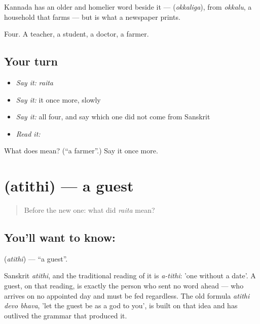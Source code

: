 Kannada has an older and homelier word beside it —  (\emph{okkaliga}), from \emph{okkalu}, a household that farms — but  is what a newspaper prints.

\begin{grammarlens}[title={What you've built}]
Four. A teacher, a student, a doctor, a farmer.
\end{grammarlens}

\subsection*{Your turn}
\begin{itemize}
\raggedright
  \item \emph{Say it:} \emph{raita}
  \item \emph{Say it:} it once more, slowly
  \item \emph{Say it:} all four, and say which one did not come from Sanskrit
  \item \emph{Read it:} \textbf{}
\end{itemize}

\begin{tcolorbox}[breakable,colback=teal!4,colframe=teal!35!black,title={Before you move on}]
What does  mean? (\textquotedblleft{}a farmer\textquotedblright{}.) Say it once more.
\end{tcolorbox}
\section[\texorpdfstring{\kn{ಅತಿಥಿ} (atithi)}{ಅತಿಥಿ (atithi)}]{ (atithi) — a guest}

\label{lesson:KA-C48-guest}



\begin{quote}
Before the new one: what did \emph{raita} mean?
\end{quote}

\subsection*{You'll want to know: }
\textbf{} (\emph{atithi}) — \textquotedblleft{}a guest\textquotedblright{}.

Sanskrit \emph{atithi}, and the traditional reading of it is \emph{a-tithi}: 'one without a date'. A guest, on that reading, is exactly the person who sent no word ahead — who arrives on no appointed day and must be fed regardless. The old formula \emph{atithi devo bhava}, 'let the guest be as a god to you', is built on that idea and has outlived the grammar that produced it.

